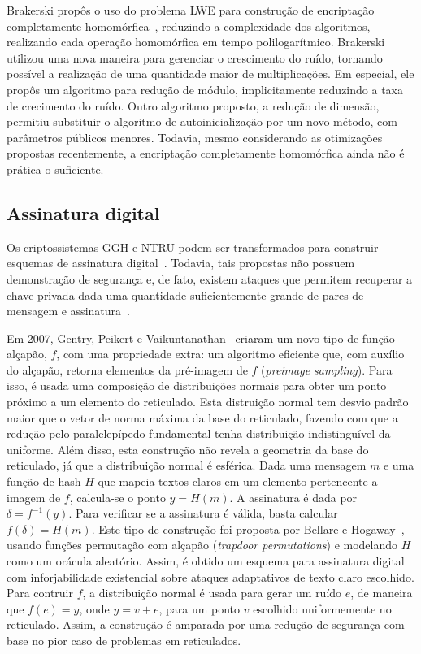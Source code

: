 \documentclass{SBCbookchapter}
\begin{document}
\begin{otherlanguage}{brazilian}
Brakerski propôs o uso do problema LWE para construção de encriptação completamente homomórfica~\cite{brakerski}, reduzindo a complexidade dos algoritmos, realizando cada operação homomórfica em tempo polilogarítmico. Brakerski utilizou uma nova maneira para gerenciar o crescimento do ruído, tornando possível a realização de uma quantidade maior de multiplicações. Em especial, ele propôs um algoritmo para redução de módulo, implicitamente reduzindo a taxa de crecimento do ruído. Outro algoritmo proposto, a redução de dimensão, permitiu substituir o algoritmo de autoinicialização por um novo método, com parâmetros públicos menores. Todavia, mesmo considerando as otimizações propostas recentemente, a encriptação completamente homomórfica ainda não é prática o suficiente. 

\subsection{Assinatura digital}
\label{signsec}

Os criptossistemas GGH e NTRU podem ser transformados para construir esquemas de assinatura digital~\cite{bernstein-buchmann-dahmen}. Todavia, tais propostas não possuem demonstração de segurança e, de fato, existem ataques que permitem recuperar a chave privada dada uma quantidade suficientemente grande de pares de mensagem e assinatura~\cite{signattack2}. 

Em 2007, Gentry, Peikert e Vaikuntanathan~\cite{signtrap} criaram um novo tipo de função alçapão, $f$, com uma propriedade extra: um algoritmo eficiente que, com auxílio do alçapão, retorna elementos da pré-imagem de $f$ (\textit{preimage sampling}). Para isso, é usada uma composição de distribuições normais para obter um ponto próximo a um elemento do reticulado. Esta distruição normal tem desvio padrão maior que o vetor de norma máxima da base do reticulado, fazendo com que a redução pelo paralelepípedo fundamental tenha distribuição indistinguível da uniforme. Além disso, esta construção não revela a geometria da base do reticulado, já que a distribuição normal é esférica. Dada uma mensagem $m$ e uma função de hash $H$ que mapeia textos claros em um elemento pertencente a imagem de $f$, calcula-se o ponto $y = H(m)$. A assinatura é dada por $\delta = f^{-1}(y)$. Para verificar se a assinatura é válida, basta calcular $f(\delta) = H(m)$. Este tipo de construção foi proposta por Bellare e Hogaway~\cite{br93}, usando funções permutação com alçapão (\textit{trapdoor permutations}) e modelando $H$ como um orácula aleatório. Assim, é obtido um esquema para assinatura digital com inforjabilidade existencial sobre ataques adaptativos de texto claro escolhido. Para contruir $f$, a distribuição normal é usada para gerar um ruído $e$, de maneira que $f(e)=y$, onde $y=v+e$, para um ponto $v$ escolhido uniformemente no reticulado. Assim, a construção é amparada por uma redução de segurança com base no pior caso de problemas em reticulados.


\end{otherlanguage}
\end{document}
